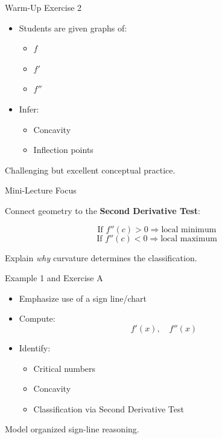 \documentclass[dvipsnames]{beamer}
\begin{document}
\begin{frame}{Warm-Up Exercise 2}

\begin{itemize}
\item Students are given graphs of:
\begin{itemize}
    \item $f$
    \item $f'$
    \item $f''$
\end{itemize}
\item Infer:
\begin{itemize}
    \item Concavity
    \item Inflection points
\end{itemize}
\end{itemize}

\alert{Challenging but excellent conceptual practice.}
\end{frame}

\begin{frame}{Mini-Lecture Focus}

Connect geometry to the \textbf{Second Derivative Test}:

\[
\text{If } f''(c) > 0 \Rightarrow \text{local minimum}
\]
\[
\text{If } f''(c) < 0 \Rightarrow \text{local maximum}
\]

\medskip

Explain \emph{why} curvature determines the classification.
\end{frame}

\begin{frame}{Example 1 and Exercise A}

\begin{itemize}
\item Emphasize use of a sign line/chart
\item Compute:
\[
f'(x), \quad f''(x)
\]
\item Identify:
\begin{itemize}
    \item Critical numbers
    \item Concavity
    \item Classification via Second Derivative Test
\end{itemize}
\end{itemize}

\alert{Model organized sign-line reasoning.}
\end{frame}
\end{document}
